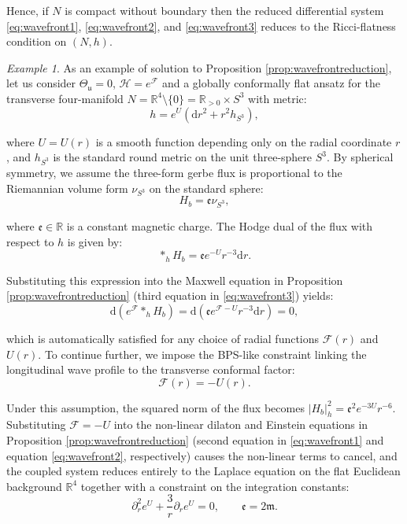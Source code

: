 \documentclass[10pt,a4paper,twoside,reqno]{amsart}
\theoremstyle{plain}
\theoremstyle{definition}
\theoremstyle{remark}
\newtheorem{example}[thm]{Example}
\def\R{\mathbb{R}}
\def\dd{\mathrm{d}}
\def\cH{\mathcal{H}}
\def\cF{\mathcal{F}}
\def\R{\mathbb{R}}
\def\cH{\mathcal{H}}
\def\dd{\mathrm{d}}
\def\fru{\mathfrak{u}}
\begin{document}
\noindent
Hence, if $N$ is compact without boundary then the reduced differential system \eqref{eq:wavefront1}, \eqref{eq:wavefront2}, and \eqref{eq:wavefront3} reduces to the Ricci-flatness condition on $(N,h)$.

\begin{example}
\label{ep:susyexample}
As an example of solution to Proposition \ref{prop:wavefrontreduction}, let us consider $\Theta_{\fru} = 0$, $\cH=e^{\cF}$ and a globally conformally flat ansatz for the transverse four-manifold $N = \mathbb{R}^4 \setminus \{0\} = \mathbb{R}_{>0}\times S^3$ with metric:
\begin{equation*}
h = e^{U}(\dd r^2 + r^2 h_{S^3}),
\end{equation*}

\noindent
where $U = U(r)$ is a smooth function depending only on the radial coordinate $r$, and $h_{S^3}$ is the standard round metric on the unit three-sphere $S^3$. By spherical symmetry, we assume the three-form gerbe flux is proportional to the Riemannian volume form $\nu_{S^3}$  on the standard sphere:
\begin{equation*}
H_b = \mathfrak{e} \nu_{S^3},
\end{equation*}

\noindent
where $\mathfrak{e}\in\R$ is a constant magnetic charge. The Hodge dual of the flux with respect to $h$ is given by:
\begin{equation*}
\ast_h H_b = \mathfrak{e} e^{-U} r^{-3} \dd r.
\end{equation*}

\noindent
Substituting this expression into the Maxwell equation in Proposition \ref{prop:wavefrontreduction} (third equation in \eqref{eq:wavefront3}) yields:
\begin{equation*}
\dd(e^{\cF} \ast_h H_b) = \dd(\mathfrak{e} e^{\cF - U} r^{-3} \dd r) = 0,
\end{equation*}

\noindent
which is automatically satisfied for any choice of radial functions $\cF(r)$ and $U(r)$. To continue further, we impose the BPS-like constraint linking the longitudinal wave profile to the transverse conformal factor:
\begin{equation*}
\cF(r) = - U(r).
\end{equation*}

\noindent
Under this assumption, the squared norm of the flux becomes $\vert H_b \vert^2_h = \mathfrak{e}^2 e^{-3U} r^{-6}$. Substituting $\cF = -U$ into the non-linear dilaton and Einstein equations in Proposition \ref{prop:wavefrontreduction} (second equation in \eqref{eq:wavefront1} and equation \eqref{eq:wavefront2}, respectively) causes the non-linear terms to cancel, and the coupled system reduces entirely to the Laplace equation on the flat Euclidean background $\mathbb{R}^4$ together with a constraint on the integration constants:
\begin{equation*}
\partial_r^2 e^{U} + \frac{3}{r} \partial_r e^{U} = 0,\qquad \mathfrak{e}  = 2\mathfrak{m}.
\end{equation*}


\end{example}
\end{document}

